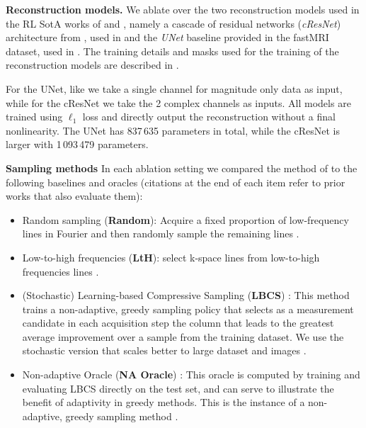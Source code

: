 \textbf{Reconstruction models.}
We ablate over the two reconstruction models used in the RL SotA works of \citet{pineda2020active} and \citet{bakker2020experimental}, namely a cascade of residual networks (\textit{cResNet}) architecture from \citet{zhang2019reducing}, used in \citet{pineda2020active} and the \textit{UNet} baseline provided in the fastMRI dataset, used in \citet{bakker2020experimental}. The training details and masks used for the training of the reconstruction models are described in .

For the UNet, like \citet{bakker2020experimental} we take a single channel for magnitude only data as input, while for the cResNet we take the 2 complex channels as inputs. All models are trained using $\ell_1$ loss and directly output the reconstruction without a final nonlinearity. The UNet has 837\,635 parameters in total, while the cResNet is larger with 1\,093\,479 parameters.

\textbf{Sampling methods}
In each ablation setting we compared the method of \citet{bakker2020experimental} to the following baselines and oracles (citations at the end of each item refer to prior works that also evaluate them):
\vspace{-2mm}
\begin{itemize}%
    \item Random sampling (\textbf{Random}): Acquire a fixed proportion of low-frequency lines in Fourier and then randomly sample the remaining lines  \citep{jin2019self,pineda2020active,bakker2020experimental}.\\[-.5cm]
    \item Low-to-high frequencies (\textbf{LtH}): select k-space lines from low-to-high frequencies lines \citep{zhang2019reducing, pineda2020active,jin2019self}.
    \item (Stochastic) Learning-based Compressive Sampling (\textbf{LBCS}) \citep{gozcu2018learning, sanchez2019scalable}: This method trains a non-adaptive, greedy sampling policy that selects as a measurement candidate in each acquisition step the column that leads to the greatest average improvement over a sample from the training dataset. We use the stochastic version that scales better to large dataset and images \citep{jin2019self}.
    \item Non-adaptive Oracle (\textbf{NA Oracle}) \citep{bakker2020experimental}: This oracle is computed by training and evaluating LBCS directly on the test set, and can serve to illustrate the benefit of adaptivity in greedy methods. This is the instance of a non-adaptive, greedy sampling method \citep{bakker2020experimental}.
\end{itemize}

